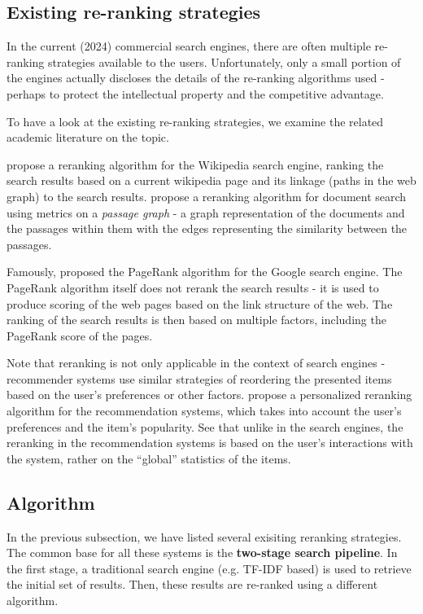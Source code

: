 \subsection{Existing re-ranking strategies}

In the current (2024) commercial search engines, there are often multiple re-ranking strategies available to the users.
Unfortunately, only a small portion of the engines actually discloses the details of the re-ranking algorithms used - perhaps to protect the intellectual property and the competitive advantage.

To have a look at the existing re-ranking strategies, we examine the related academic literature on the topic.

\cite{wikipedia-rerank} propose a reranking algorithm for the Wikipedia search engine, ranking the search results based on a current wikipedia page and its linkage (paths in the web graph) to the search results.
\cite{passage-graph} propose a reranking algorithm for document search using metrics on a \textit{passage graph} - a graph representation of the documents and the passages within them
with the edges representing the similarity between the passages.

Famously, \cite{pagerank} proposed the PageRank algorithm for the Google search engine.
The PageRank algorithm itself does not rerank the search results - it is used to produce scoring of the web pages based on the link structure of the web.
The ranking of the search results is then based on multiple factors, including the PageRank score of the pages.

Note that reranking is not only applicable in the context of search engines - recommender systems use similar strategies of reordering the presented items based on the user's preferences or other factors.
\cite{personalized-reranking} propose a personalized reranking algorithm for the recommendation systems, which takes into account the user's preferences and the item's popularity.
See that unlike in the search engines, the reranking in the recommendation systems is based on the user's interactions with the system, rather on the ``global'' statistics of the items.

\subsection{Algorithm}\label{reranking-algorithm}

In the previous subsection, we have listed several exisiting reranking strategies.
The common base for all these systems is the \textbf{two-stage search pipeline}. 
In the first stage, a traditional search engine (e.g. TF-IDF based) is used to retrieve the initial set of results. 
Then, these results are re-ranked using a different algorithm. 

